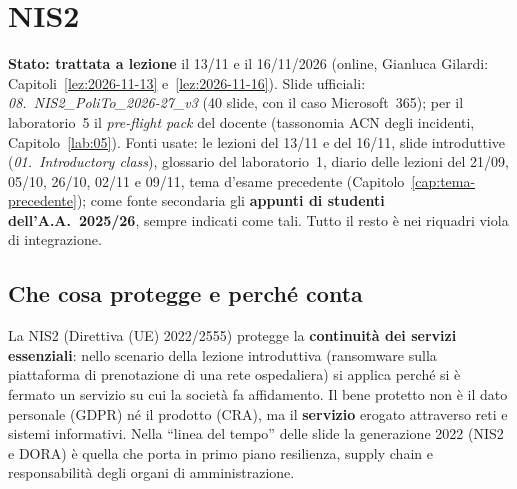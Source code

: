 \chapter{NIS2}
\label{cap:nis2}

\begin{nota}
\textbf{Stato: trattata a lezione} il 13/11 e il 16/11/2026 (online, Gianluca Gilardi:
Capitoli~\ref{lez:2026-11-13} e~\ref{lez:2026-11-16}). Slide ufficiali: \emph{08.~NIS2\_PoliTo\_2026-27\_v3}
(40 slide, con il caso Microsoft~365); per il laboratorio~5 il \emph{pre-flight pack} del docente
(tassonomia ACN degli incidenti, Capitolo~\ref{lab:05}). Fonti usate: le lezioni del 13/11 e del 16/11, slide introduttive (\emph{01.~Introductory class}), glossario del
laboratorio~1, diario delle lezioni del 21/09, 05/10, 26/10, 02/11 e 09/11, tema d'esame precedente
(Capitolo~\ref{cap:tema-precedente});
come fonte secondaria gli \textbf{appunti di studenti dell'A.A.~2025/26}, sempre indicati come tali.
Tutto il resto è nei riquadri viola di integrazione.
\end{nota}

\section{Che cosa protegge e perché conta}
\label{sec:nis2-inquadramento}

La NIS2 (Direttiva (UE) 2022/2555) protegge la \textbf{continuità dei servizi essenziali}: nello
scenario della lezione introduttiva (ransomware sulla piattaforma di prenotazione di una rete
ospedaliera) si applica perché si è fermato un servizio su cui la società fa affidamento. Il bene
protetto non è il dato personale (GDPR) né il prodotto (CRA), ma il \textbf{servizio} erogato
attraverso reti e sistemi informativi. Nella ``linea del tempo'' delle slide la generazione 2022
(NIS2 e DORA) è quella che porta in primo piano resilienza, supply chain e responsabilità degli organi
di amministrazione.

